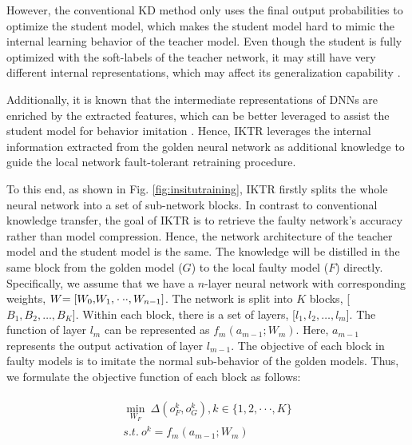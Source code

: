 However, the conventional KD method only uses the final output probabilities to optimize the student model, which makes the student model hard to mimic the internal learning behavior of the teacher model. Even though the student is fully optimized with the soft-labels of the teacher network, it may still have very different internal representations, which may affect its  generalization capability  \cite{DBLP:journals/corr/abs-1910-03723}. 

Additionally, it is known that the intermediate representations of DNNs are enriched by the extracted features, which can be better leveraged to assist the student model for behavior imitation \cite{app9101966}. Hence, IKTR leverages the internal information extracted from the golden neural network as additional knowledge to guide the local network fault-tolerant retraining procedure. 

To this end, as shown in Fig. \ref{fig:insitutraining}, IKTR firstly splits the whole neural network into a set of sub-network blocks. In contrast to conventional knowledge transfer, the goal of IKTR is to retrieve the faulty network's accuracy rather than model compression. Hence, the network architecture of the teacher model and the student model is the same. The knowledge will be distilled in the same block from the golden model ($G$) to the local faulty model ($F$) directly. Specifically, we assume that we have a $n$-layer neural network with corresponding weights, $W{\rm{ = [}}{W_0}{\rm{,}} {W_1}{\rm{,}} \cdot  \cdot  \cdot ,{W_{n-1}}{\rm{]}}$. The network is split into $K$ blocks, [$B_1,B_2,\dots,B_K$]. Within each block, there is a set of layers, [$l_1,l_2,\dots,l_m$]. The function of layer $l_m$ can be represented as $f_m({a_{m - 1}};W_m)$. Here, $a_{m-1}$ represents the output activation of layer $l_{m-1}$. The objective of each block in faulty models is to imitate the normal sub-behavior of the golden models.  Thus, we formulate the objective function of each block as follows:

\begin{equation}
    \begin{aligned}
        \begin{split}
            \mathop {\min }  \limits_{{W_F}} \ \Delta ({o_F^k},o_G^k), k \in \{ 1,2, \cdot  \cdot  \cdot ,K\} \\
            s.t. \ {o^k} = {f_{m}}({a_{m - 1}};W_m)\\
        \end{split}
    \end{aligned}
\end{equation}

